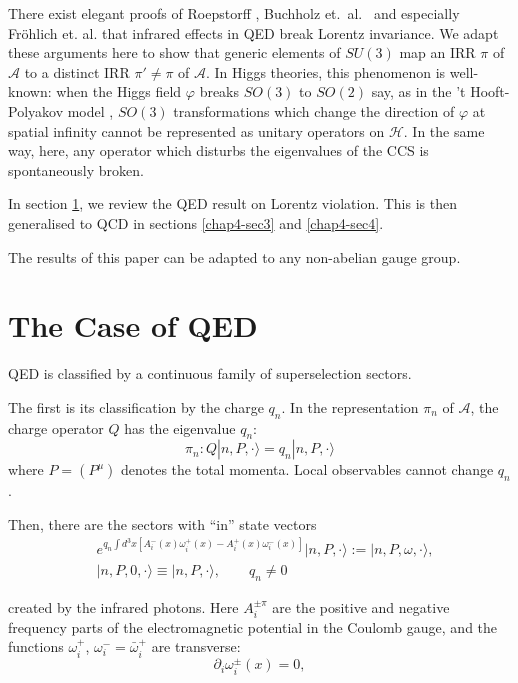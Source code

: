There exist elegant proofs of Roepstorff \cite{chap4-key6}, Buchholz et.\ al.\ \cite{chap4-key2} and especially Fr\"ohlich et. al. \cite{chap4-key3} that infrared effects in QED break Lorentz invariance. We adapt these arguments here to show that generic elements of $S\!U(3)$ map an IRR $\pi$ of $\mathcal{A}$ to a distinct IRR $\pi'\neq \pi$ of $\mathcal{A}$. In Higgs theories, this phenomenon is well-known: when the Higgs field $\varphi$ breaks $S\!O(3)$ to $S\!O(2)$ say, as in the 't Hooft-Polyakov model \cite{chap4-key7}, $S\!O(3)$ transformations which change the direction of $\varphi$ at spatial infinity cannot be represented as unitary operators on $\mathcal{H}$. In the same way, here, any operator which disturbs the eigenvalues of the CCS is spontaneously broken.

In section \ref{chap4-sec2}, we review the QED result on Lorentz violation. This is then generalised to QCD in sections \ref{chap4-sec3} and \ref{chap4-sec4}.

The results of this paper can be adapted to any non-abelian gauge group.

\section{The Case of QED}\label{chap4-sec2}

QED is classified by a continuous family of superselection sectors.

The first is its classification by the charge $q_{n}$. In the representation $\pi_{n}$ of $\mathcal{A}$, the charge operator $Q$ has the eigenvalue $q_{n}$:
\begin{equation}
\pi_{n}: Q|n,P,\cdot \rangle=q_{n}|n,P,\cdot\rangle\label{chap4-eq2.1}
\end{equation}
where $P = (P^{\mu})$ denotes the total momenta. Local observables cannot change $q_{n}$.

Then, there are the sectors with ``in'' state vectors \cite{chap4-key4}
\begin{align}
& e^{q_{n}\int d^{3}x[A^{-}_{i}(x)\omega^{+}_{i}(x)-A^{+}_{i}(x)\omega^{-}_{i}(x)]}|n,P,\cdot\rangle := |n,P,\omega,\cdot\rangle,\label{chap4-eq2.2}\\
& |n,P,0,\cdot\rangle \equiv |n,P,\cdot\rangle,\qquad q_{n}\neq 0\label{chap4-eq2.3}
\end{align}

created by the infrared photons. Here $A^{\pm \pi}_{i}$ are the positive and negative frequency parts of the electromagnetic potential in the Coulomb gauge, and the functions $\omega^{+}_{i}$, $\omega^{-}_{i}=\bar{\omega}^{+}_{i}$ are transverse:
\begin{equation}
\partial_{i}\omega^{\pm}_{i}(x)=0,\label{chap4-eq2.4}
\end{equation}


